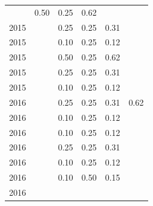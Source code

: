 \begin{table}[H]
\begin{tabular}{| l | c | c | c | c | c |}
          &
          0.50
          &
          0.25
          &
          0.62
          &
          \\
            2015
          &
          
          &
          0.25
          &
          0.25
          &
          0.31
          &
          \\
            2015
          &
          
          &
          0.10
          &
          0.25
          &
          0.12
          &
          \\
            2015
          &
          
          &
          0.50
          &
          0.25
          &
          0.62
          &
          \\
            2015
          &
          
          &
          0.25
          &
          0.25
          &
          0.31
          &
          \\
            2015
          &
          
          &
          0.10
          &
          0.25
          &
          0.12
          &
          \\
\hline
            2016
          &
          
          &
          0.25
          &
          0.25
          &
          0.31
          &
            {\color{blue} 0.62}
          \\
            2016
          &
          
          &
          0.10
          &
          0.25
          &
          0.12
          &
          \\
            2016
          &
          
          &
          0.10
          &
          0.25
          &
          0.12
          &
          \\
            2016
          &
          
          &
          0.25
          &
          0.25
          &
          0.31
          &
          \\
            2016
          &
          
          &
          0.10
          &
          0.25
          &
          0.12
          &
          \\
            2016
          &
          
          &
          0.10
          &
          0.50
          &
          0.15
          &
          \\
            2016
          &
          

\end{tabular}
\end{table}
